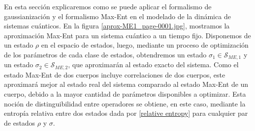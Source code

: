 \documentclass{report} %
\numberwithin{equation}{section}
\begin{document}
En esta sección explicaremos como se puede aplicar el formalismo de gaussianización y el formalismo Max-Ent en el modelado de la dinámica de sistemas cuánticos. En la figura \ref{aprox-ME1_page-0001.jpg}, mostramos la aproximación Max-Ent para un sistema cuántico a un tiempo fijo. Disponemos de un estado $\rho$ en el espacio de estados, luego, mediante un proceso de optimización de los parámetros de cada clase de estados, obtendremos un estado $\sigma_1 \in \mathcal{S}_{ME,1}$ y un estado $\sigma_2 \in \mathcal{S}_{ME,2}$, que aproximarán al estado exacto del sistema. Como el estado Max-Ent de dos cuerpos incluye correlaciones de dos cuerpos, este aproximará mejor al estado real del sistema comparado al estado Max-Ent de un cuerpo, debido a la mayor cantidad de parámetros disponibles a optimizar. Esta noción de distinguibilidad entre operadores se obtiene, en este caso, mediante la entropía relativa entre dos estados dada por \ref{relative entropy} para cualquier par de estados $\rho$ y $\sigma$. 
\end{document}
